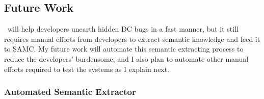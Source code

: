 \documentclass[10pt]{article}
\begin{document}




\subsection{Future Work}

\fullcheck\ will help developers unearth hidden DC bugs in a fast manner, but it
still requires manual efforts from developers to extract semantic knowledge and
feed it to SAMC.
%
My future work will automate this semantic extracting process to reduce the
developers' burdensome, and I also plan to automate other manual efforts required
to test the systems as I explain next.

\subsubsection*{Automated Semantic Extractor}
\end{document}
